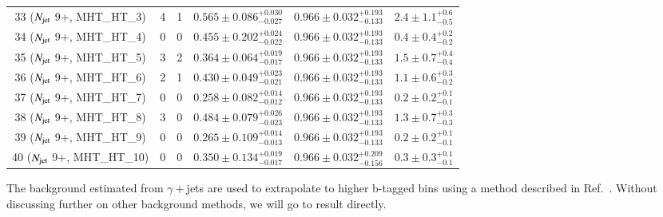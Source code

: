 \begin{table}[h]
\begin{tabular}{|c|rr|c|c|r|}
 33 ($N_{\rm jet}$ 9+, MHT\_HT\_3)    &    4 &     1 & $0.565\pm0.086^{+0.030}_{-0.027}$ & $0.966\pm0.032^{+0.193}_{-0.133}$ & $   2.4\pm 1.1^{+ 0.6}_{- 0.5}$ \\      
 34 ($N_{\rm jet}$ 9+, MHT\_HT\_4)    &    0 &     0 & $0.455\pm0.202^{+0.024}_{-0.022}$ & $0.966\pm0.032^{+0.193}_{-0.133}$ & $   0.4\pm 0.4^{+ 0.2}_{- 0.2}$ \\      
 35 ($N_{\rm jet}$ 9+, MHT\_HT\_5)    &    3 &     2 & $0.364\pm0.064^{+0.019}_{-0.017}$ & $0.966\pm0.032^{+0.193}_{-0.133}$ & $   1.5\pm 0.7^{+ 0.4}_{- 0.4}$ \\      
 36 ($N_{\rm jet}$ 9+, MHT\_HT\_6)    &    2 &     1 & $0.430\pm0.049^{+0.023}_{-0.021}$ & $0.966\pm0.032^{+0.193}_{-0.133}$ & $   1.1\pm 0.6^{+ 0.3}_{- 0.2}$ \\      
 37 ($N_{\rm jet}$ 9+, MHT\_HT\_7)    &    0 &     0 & $0.258\pm0.082^{+0.014}_{-0.012}$ & $0.966\pm0.032^{+0.193}_{-0.133}$ & $   0.2\pm 0.2^{+ 0.1}_{- 0.1}$ \\      
 38 ($N_{\rm jet}$ 9+, MHT\_HT\_8)    &    3 &     0 & $0.484\pm0.079^{+0.026}_{-0.023}$ & $0.966\pm0.032^{+0.193}_{-0.133}$ & $   1.3\pm 0.7^{+ 0.3}_{- 0.3}$ \\      
 39 ($N_{\rm jet}$ 9+, MHT\_HT\_9)    &    0 &     0 & $0.265\pm0.109^{+0.014}_{-0.013}$ & $0.966\pm0.032^{+0.193}_{-0.133}$ & $   0.2\pm 0.2^{+ 0.1}_{- 0.1}$ \\      
 40 ($N_{\rm jet}$ 9+, MHT\_HT\_10)   &    0 &     0 & $0.350\pm0.134^{+0.019}_{-0.017}$ & $0.966\pm0.032^{+0.209}_{-0.156}$ & $   0.3\pm 0.3^{+ 0.1}_{- 0.1}$ \\    
\hline
\end{tabular}
\end{table}



The background estimated from $\gamma +$jets are used to extrapolate to higher b-tagged bins using a method described in Ref.~\cite{CMS-PAS-SUS-16-014}. Without discussing further on other background methods, we will go to result directly. 













